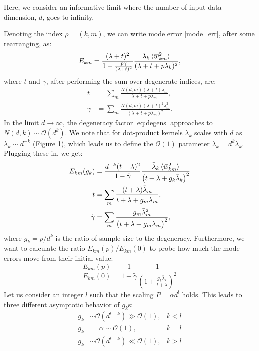 \documentclass{article}
\begin{document}
Here, we consider an informative limit where the number of input data dimension, $d$, goes to infinity.

Denoting the index $\rho = (k,m)$, we can write mode error \eqref{mode_err}, after some rearranging, as:
\begin{equation}\label{mode_err_1}
    E_{km} = \frac{(\lambda + t)^2}{1 - \frac{p \gamma}{(\lambda + t)^2}}\frac{\lambda_k\braket{\overline{w}_{km}^2}}{(\lambda+t+p\lambda_k)^2}, 
\end{equation}
where $t$ and $\gamma$, after performing the sum over degenerate indices, are:
%
\begin{align}
    t &= \sum_m \frac{N(d,m)(\lambda+t)\lambda_m}{\lambda+t+p\lambda_m}, \nonumber \\
    \gamma &= \sum_m \frac{N(d,m)(\lambda+t)^2\lambda_m^2}{(\lambda+t+p\lambda_m)^2}.
\end{align}
In the limit $d\to\infty$, the degeneracy factor \eqref{eq:degens} approaches to $N(d,k)  \sim \mathcal{O}(d^k)$. We note that for dot-product kernels $\lambda_k$ scales with $d$ as $\lambda_k \sim d^{-k}$ \cite{smola2001dotproduct} (Figure 1), which leads us to define the $\mathcal{O}(1)$ parameter $\bar\lambda_k = d^k\lambda_k$. Plugging these in, we get:
\begin{align}
E_{km}(g_k) &= \frac{d^{-k}(t+\lambda)^2}{1-\tilde\gamma}\frac{\bar\lambda_k\braket{\bar w_{km}^2}}{\left(t+\lambda+g_k \bar\lambda_k\right)^2}\nonumber\\
t &= \sum_m \frac{(t+\lambda)\bar\lambda_m}{t+\lambda+g_m\bar\lambda_m},\nonumber \\
\tilde\gamma &= \sum_m \frac{g_m \bar\lambda_m^2}{\left(t+\lambda+g_m\bar\lambda_m\right)^2},
\end{align}
where $g_k = p/d^k$ is the ratio of sample size to the degeneracy. Furthermore, we want to calculate the ratio $E_{km}(p)/E_{km}(0)$ to probe how much the mode errors move from their initial value:
\begin{equation}\label{mode_error_approx}
    \frac{E_{km}(p)}{E_{km}(0)} =  \frac{1}{1-\tilde\gamma}\frac{1}{\left(1+\frac{g_k \bar\lambda_k}{t+\lambda}\right)^2}
\end{equation}
Let us consider an integer $l$ such that the scaling $P = \alpha d^l$ holds. This leads to three different asymptotic behavior of $g_k$s:
\begin{align}\label{gk_scaling}
g_{k} &\sim \mathcal{O}(d^{l-k}) \gg \mathcal{O}(1),& k<l \nonumber \\
g_k &= \alpha \sim \mathcal{O}(1) ,& k=l \nonumber \\
g_{k} &\sim \mathcal{O}(d^{l-k}) \ll \mathcal{O}(1),& k>l
\end{align}
\end{document}

